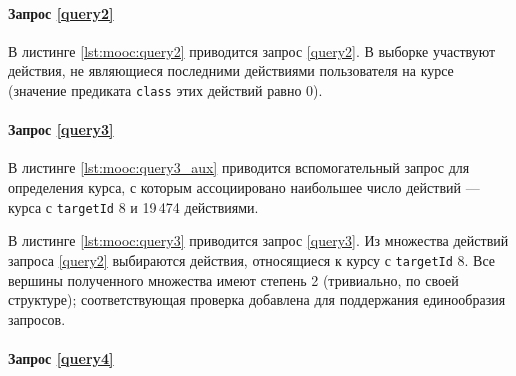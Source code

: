 \paragraph{Запрос \ref{query2}}

В листинге \ref{lst:mooc:query2} приводится запрос \ref{query2}. В выборке участвуют действия, не являющиеся последними
действиями пользователя на курсе (значение предиката \texttt{class} этих действий равно 0).

\paragraph{Запрос \ref{query3}}

В листинге \ref{lst:mooc:query3_aux} приводится вспомогательный запрос для определения курса, с которым ассоциировано
наибольшее число действий --- курса с \texttt{targetId} 8 и 19\,474 действиями.

В листинге \ref{lst:mooc:query3} приводится запрос \ref{query3}. Из множества действий запроса \ref{query2} выбираются
действия, относящиеся к курсу с \texttt{targetId} 8. Все вершины полученного множества имеют степень 2
(тривиально, по своей структуре); соответствующая проверка добавлена для поддержания единообразия запросов.

\paragraph{Запрос \ref{query4}}

